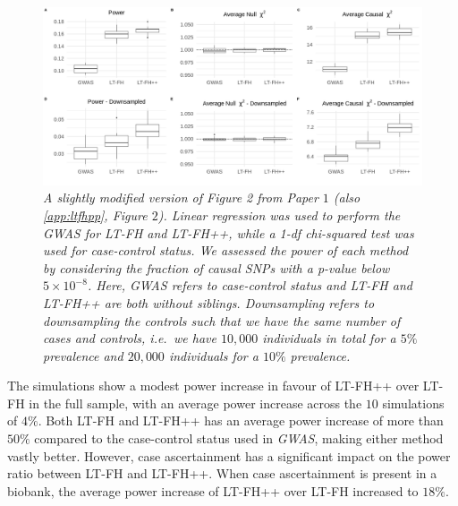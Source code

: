 \begin{figure}[h]
	\includegraphics[width=\textwidth]{results/boxplot_05prev_both.png}
	\caption[Simulation results for a $ 5\% $ prevalence, with and without downsampling of controls]{
		\sl A slightly modified version of Figure 2 from Paper $ 1 $\cite{pedersen2022accounting} (also \cref{app:ltfhpp}, Figure $ 2 $). Linear regression was used to perform the GWAS for LT-FH and LT-FH++, while a 1-df chi-squared test was used for case-control status. We assessed the power of each method by considering the fraction of causal SNPs with a p-value below $ 5 \times 10^{-8} $. Here, GWAS refers to case-control status and LT-FH and LT-FH++ are both without siblings. Downsampling refers to downsampling the controls such that we have the same number of cases and controls, i.e.\, we have $ 10,000 $ individuals in total for a $ 5\% $ prevalence and $ 20,000 $ individuals for a $ 10\% $ prevalence.}
	\label{fig:LTFHppSimulationResults}
\end{figure}

The simulations show a modest power increase in favour of LT-FH++ over LT-FH in the full sample, with an average power increase across the $ 10 $ simulations of $ 4\% $. Both LT-FH and LT-FH++ has an average power increase of more than $ 50\% $ compared to the case-control status used in \textit{GWAS}, making either method vastly better. However, case ascertainment has a significant impact on the power ratio between LT-FH and LT-FH++. When case ascertainment is present in a biobank, the average power increase of LT-FH++ over LT-FH increased to $ 18\% $.

\newpage

